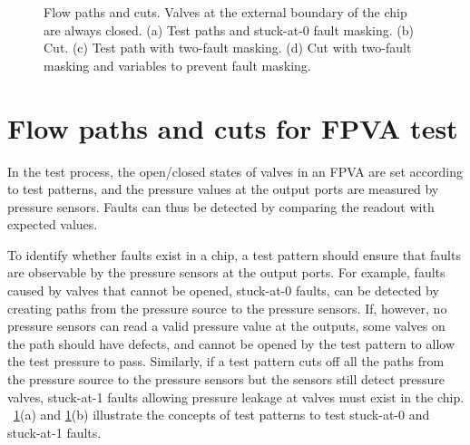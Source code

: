 \begin{figure}[t]
{\figurefontsize
\centering

\caption{Flow paths and cuts. Valves at the external boundary of the chip are always closed. (a) Test paths and stuck-at-0 fault masking. (b) Cut.  (c) Test path with two-fault masking. (d) Cut with two-fault masking and variables to prevent fault masking.}
\label{fig:path_cutset}
}
\end{figure}


\section{Flow paths and cuts for FPVA test} %
\label{sec:test_strategy}

In the test process, the open/closed states of valves in an FPVA are set
according to test patterns,
and the pressure values at the output ports are measured by 
pressure sensors. Faults can thus be detected by comparing the readout
with expected values.


To identify whether faults exist in a chip, a test pattern should ensure
that faults are observable by the pressure sensors at the output ports.
For example, faults caused by valves that cannot be opened, stuck-at-0 faults, 
can be detected by creating paths from the pressure source to the pressure
sensors. If, however, no pressure sensors can read a valid pressure value at
the outputs, some valves on the path should have defects, and cannot
be opened by the test pattern to allow the test pressure to pass. 
Similarly, if a test pattern 
cuts off all the paths 
from the pressure source to the pressure sensors but 
the sensors still detect pressure valves, 
stuck-at-1 faults allowing pressure leakage at valves must exist in the chip.
\figname~\ref{fig:path_cutset}(a) and \ref{fig:path_cutset}(b) 
illustrate the concepts of test patterns to
test stuck-at-0 and stuck-at-1 faults.

